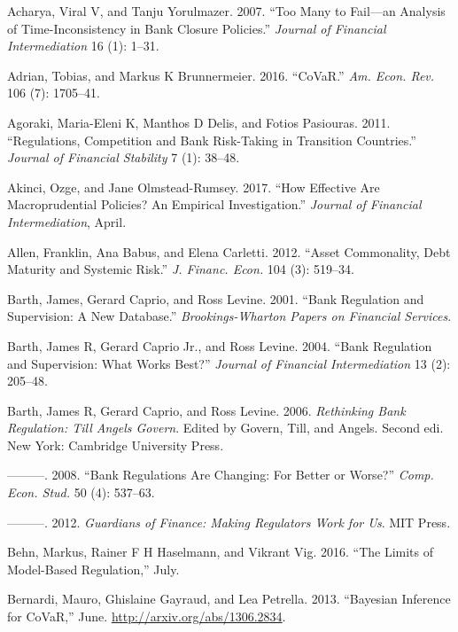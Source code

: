 \documentclass[
  10pt,
]{article}
\begin{document}
\leavevmode\hypertarget{ref-Acharya2007}{}%
Acharya, Viral V, and Tanju Yorulmazer. 2007. ``Too Many to Fail---an
Analysis of Time-Inconsistency in Bank Closure Policies.'' \emph{Journal
of Financial Intermediation} 16 (1): 1--31.

\leavevmode\hypertarget{ref-Adrian2016}{}%
Adrian, Tobias, and Markus K Brunnermeier. 2016. ``CoVaR.'' \emph{Am.
Econ. Rev.} 106 (7): 1705--41.

\leavevmode\hypertarget{ref-Agoraki2011}{}%
Agoraki, Maria-Eleni K, Manthos D Delis, and Fotios Pasiouras. 2011.
``Regulations, Competition and Bank Risk-Taking in Transition
Countries.'' \emph{Journal of Financial Stability} 7 (1): 38--48.

\leavevmode\hypertarget{ref-Akinci2017}{}%
Akinci, Ozge, and Jane Olmstead-Rumsey. 2017. ``How Effective Are
Macroprudential Policies? An Empirical Investigation.'' \emph{Journal of
Financial Intermediation}, April.

\leavevmode\hypertarget{ref-Allen2012}{}%
Allen, Franklin, Ana Babus, and Elena Carletti. 2012. ``Asset
Commonality, Debt Maturity and Systemic Risk.'' \emph{J. Financ. Econ.}
104 (3): 519--34.

\leavevmode\hypertarget{ref-Barth2001}{}%
Barth, James, Gerard Caprio, and Ross Levine. 2001. ``Bank Regulation
and Supervision: A New Database.'' \emph{Brookings-Wharton Papers on
Financial Services}.

\leavevmode\hypertarget{ref-Barth2004}{}%
Barth, James R, Gerard Caprio Jr., and Ross Levine. 2004. ``Bank
Regulation and Supervision: What Works Best?'' \emph{Journal of
Financial Intermediation} 13 (2): 205--48.

\leavevmode\hypertarget{ref-Barth2006}{}%
Barth, James R, Gerard Caprio, and Ross Levine. 2006. \emph{Rethinking
Bank Regulation: Till Angels Govern}. Edited by Govern, Till, and
Angels. Second edi. New York: Cambridge University Press.

\leavevmode\hypertarget{ref-Barth2008}{}%
---------. 2008. ``Bank Regulations Are Changing: For Better or Worse?''
\emph{Comp. Econ. Stud.} 50 (4): 537--63.

\leavevmode\hypertarget{ref-Barth2012}{}%
---------. 2012. \emph{Guardians of Finance: Making Regulators Work for
Us}. MIT Press.

\leavevmode\hypertarget{ref-Behn2016}{}%
Behn, Markus, Rainer F H Haselmann, and Vikrant Vig. 2016. ``The Limits
of Model-Based Regulation,'' July.

\leavevmode\hypertarget{ref-Bernardi2013}{}%
Bernardi, Mauro, Ghislaine Gayraud, and Lea Petrella. 2013. ``Bayesian
Inference for CoVaR,'' June. \url{http://arxiv.org/abs/1306.2834}.
\end{document}
